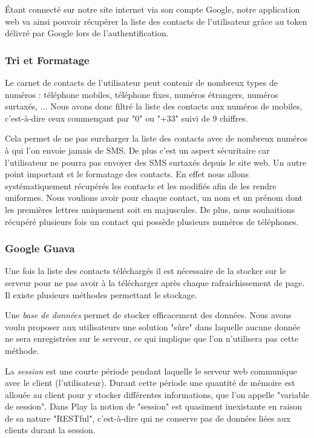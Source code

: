 Étant connecté sur notre site internet via son compte Google, notre application web va ainsi pouvoir récupérer la liste des contacts de l'utilisateur grâce au token délivré par Google lors de l'authentification.


\subsubsection{Tri et Formatage}

Le carnet de contacts de l'utilisateur peut contenir de nombreux types de numéros : téléphone mobiles, téléphone fixes, numéros étrangers, numéros surtaxés, ...
Nous avons donc filtré la liste des contacts aux numéros de mobiles, c'est-à-dire ceux commençant par "0" ou "+33" suivi de 9 chiffres.

Cela permet de ne pas surcharger la liste des contacts avec de nombreux numéros à qui l'on envoie jamais de SMS.
De plus c'est un aspect sécuritaire car l'utilisateur ne pourra pas envoyer des SMS surtaxés depuis le site web.
Un autre point important et le formatage des contacts. En effet nous allons systématiquement récupérés les contacts
et les modifiés afin de les rendre uniformes. Nous voulions avoir pour chaque contact, un nom et un prénom
dont les premières lettres uniquement soit en majuscules. De plus, nous souhaitions récupéré plusieurs fois
un contact qui possède plusieurs numéros de téléphones.


\subsubsection{Google Guava}

Une fois la liste des contacts téléchargés il est nécessaire de la stocker sur le serveur pour ne pas avoir à la télécharger après chaque rafraichissement de page.
Il existe plusieurs méthodes permettant le stockage.

Une \textit{base de données} permet de stocker efficacement des données.
Nous avons voulu proposer aux utilisateurs une solution "sûre" dans laquelle aucune donnée ne sera enregistrées sur le serveur, ce qui implique que l'on n'utilisera pas cette méthode.

La \textit{session} est une courte période pendant laquelle le serveur web communique avec le client (l'utilisateur).
Durant cette période une quantité de mémoire est allouée au client pour y stocker différentes informations, que l'on appelle "variable de session".
Dans Play la notion de "session" est quasiment inexistante en raison de sa nature "RESTful", c'est-à-dire qui ne conserve pas de données liées aux clients durant la session.

